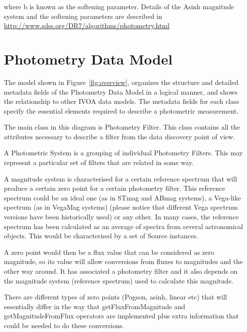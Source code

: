 \documentclass[11pt,a4paper]{ivoa}
\begin{document}
where b is known as the softening parameter. Details of the Asinh magnitude
system and the softening parameters are described in
\url{http://www.sdss.org/DR7/algorithms/photometry.html}
\par

\section{Photometry Data Model} \label{datamodel}
The model shown in Figure~\ref{fig:overview}, organizes the structure and detailed metadata
fields of the Photometry Data Model in a logical manner, and shows the
relationship to other IVOA data models. The metadata fields for each class
specify the essential elements required to describe a photometric measurement.
\par

The main class in this diagram is Photometry Filter. This class contains
all the attributes necessary to describe a filter from the data discovery
point of view.
\par

A Photometric System is a grouping of individual Photometry Filters. This may
represent a particular set of filters that are related in some way.
\par

A magnitude system is characterised for a certain reference spectrum that
will produce a certain zero point for a certain photometry filter. This
reference spectrum could be an ideal one (as in STmag and ABmag systems), a
Vega-like spectrum (as in VegaMag systems) (please notice that different Vega
spectrum versions have been historically used) or any other. In many cases,
the reference spectrum has been calculated as an average of spectra from several
astronomical objects. This would be characterised by a set of Source instances.
\par

A zero point would then be a flux value that can be considered as zero
magnitude, so its value will allow conversions from fluxes to magnitudes
and the other way around. It has associated a photometry filter and it also
depends on the magnitude system (reference spectrum) used to calculate this
magnitude.
\par

There are different types of zero points (Pogson, asinh, linear etc) that will
essentially differ in the way that getFluxFromMagnitude and getMagnitudeFromFlux
operators are implemented plus extra information that could be needed to do
these conversions.
\par
\end{document}
